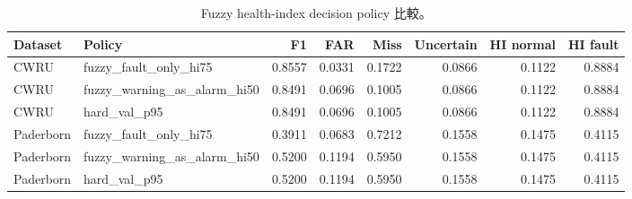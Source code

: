 \begin{table}[H]
\caption{Fuzzy health-index decision policy 比較。}
\label{tab:fuzzy_policy}
\centering
\scriptsize
\begin{tabular}{l l r r r r r r}
\toprule
Dataset & Policy & F1 & FAR & Miss & Uncertain & HI normal & HI fault \\
\midrule
CWRU & fuzzy\_fault\_only\_hi75 & 0.8557 & 0.0331 & 0.1722 & 0.0866 & 0.1122 & 0.8884 \\
CWRU & fuzzy\_warning\_as\_alarm\_hi50 & 0.8491 & 0.0696 & 0.1005 & 0.0866 & 0.1122 & 0.8884 \\
CWRU & hard\_val\_p95 & 0.8491 & 0.0696 & 0.1005 & 0.0866 & 0.1122 & 0.8884 \\
Paderborn & fuzzy\_fault\_only\_hi75 & 0.3911 & 0.0683 & 0.7212 & 0.1558 & 0.1475 & 0.4115 \\
Paderborn & fuzzy\_warning\_as\_alarm\_hi50 & 0.5200 & 0.1194 & 0.5950 & 0.1558 & 0.1475 & 0.4115 \\
Paderborn & hard\_val\_p95 & 0.5200 & 0.1194 & 0.5950 & 0.1558 & 0.1475 & 0.4115 \\
\bottomrule
\end{tabular}
\end{table}
